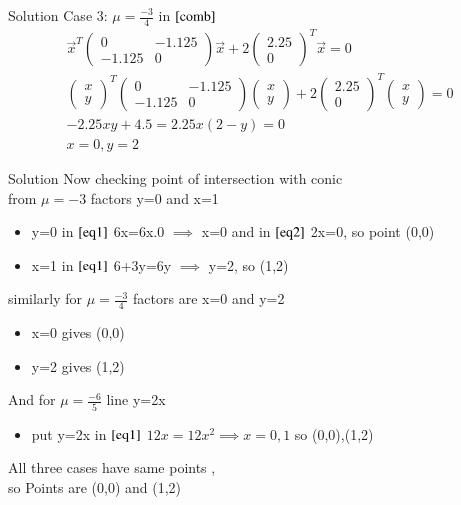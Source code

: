 \documentclass{beamer}
\begin{document}
\begin{frame}{Solution}
Case 3: $\mu=\frac{-3}{4}$ in $\eqref{comb}$
\begin{align}
    \vec{x}^T\begin{pmatrix}0&-1.125\\-1.125&0\end{pmatrix}\vec{x}+2\begin{pmatrix}2.25\\0\end{pmatrix}^T\vec{x}=0\\
    \begin{pmatrix}x\\y\end{pmatrix}^T\begin{pmatrix}0&-1.125\\-1.125&0\end{pmatrix}\begin{pmatrix}x\\y\end{pmatrix}+2\begin{pmatrix}2.25\\0\end{pmatrix}^T\begin{pmatrix}x\\y\end{pmatrix}=0\\
    -2.25xy+4.5=2.25x(2-y)=0\\
    x=0,y=2
\end{align}
\end{frame}
\begin{frame}{Solution}
Now checking point of intersection with conic\\
from $\mu=-3$ factors y=0 and x=1
\begin{itemize}
    \item y=0 in $\eqref{eq1}$ 6x=6x.0 $\implies$ x=0 and in $\eqref{eq2}$ 2x=0, so point (0,0)
    \item x=1 in $\eqref{eq1}$ 6+3y=6y $\implies$ y=2, so (1,2)
\end{itemize}
similarly for $\mu=\frac{-3}{4}$ factors are x=0 and y=2
\begin{itemize}
    \item x=0 gives (0,0)
    \item y=2 gives (1,2)
\end{itemize}
And for $\mu=\frac{-6}{5}$ line y=2x
\begin{itemize}
    \item put y=2x in $\eqref{eq1}$ $12x=12x^2\implies x=0 ,1$ so (0,0),(1,2)
\end{itemize}
All three cases have same points ,\\so Points are (0,0) and (1,2)
\end{frame}
\end{document}
